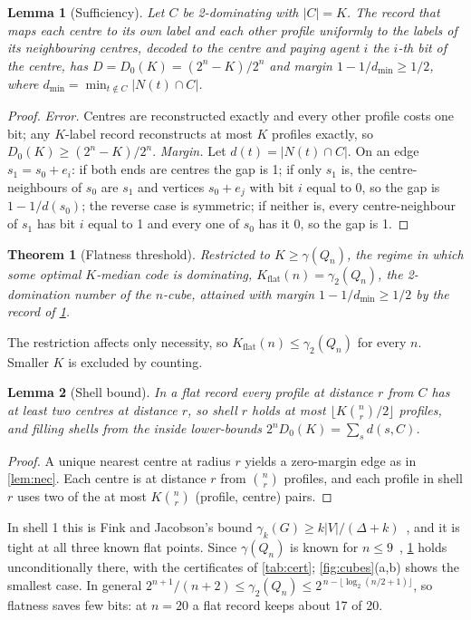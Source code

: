\documentclass[sigconf,anonymous,acmthm=false]{acmart}
\theoremstyle{acmplain}
\newtheorem{theorem}{Theorem}
\newtheorem{lemma}{Lemma}
\theoremstyle{acmdefinition}
\newcommand{\Kflat}{K_{\mathrm{flat}}}
\newcommand{\dmin}{d_{\min}}
\begin{document}
\begin{lemma}[Sufficiency]\label{lem:suff}
Let $C$ be 2-dominating with $|C|=K$. The record that maps each centre to its own label and
each other profile uniformly to the labels of its neighbouring centres, decoded to the centre
and paying agent $i$ the $i$-th bit of the centre, has $D=D_0(K)=(2^n-K)/2^n$ and margin
$1-1/\dmin\ge1/2$, where $\dmin=\min_{t\notin C}|N(t)\cap C|$.
\end{lemma}
\begin{proof}
\emph{Error.} Centres are reconstructed exactly and every other profile costs one bit; any
$K$-label record reconstructs at most $K$ profiles exactly, so $D_0(K)\ge(2^n-K)/2^n$.
\emph{Margin.} Let $d(t)=|N(t)\cap C|$. On an edge $s_1=s_0+e_i$: if both ends are centres the
gap is 1; if only $s_1$ is, the centre-neighbours of $s_0$ are $s_1$ and vertices $s_0+e_j$
with bit $i$ equal to 0, so the gap is $1-1/d(s_0)$; the reverse case is symmetric; if
neither is, every centre-neighbour of $s_1$ has bit $i$ equal to 1 and every one of $s_0$ has
it 0, so the gap is 1.
\end{proof}

\begin{theorem}[Flatness threshold]\label{thm:flat}
Restricted to $K\ge\gamma(Q_n)$, the regime in which some optimal $K$-median code is
dominating, $\Kflat(n)=\gamma_2(Q_n)$, the 2-domination number of the $n$-cube, attained with
margin $1-1/\dmin\ge1/2$ by the record of \cref{lem:suff}.
\end{theorem}

The restriction affects only necessity, so $\Kflat(n)\le\gamma_2(Q_n)$ for every $n$. Smaller
$K$ is excluded by counting.

\begin{lemma}[Shell bound]\label{lem:shell}
In a flat record every profile at distance $r$ from $C$ has at least two centres at distance
$r$, so shell $r$ holds at most $\lfloor K\binom nr/2\rfloor$ profiles, and filling shells from
the inside lower-bounds $2^nD_0(K)=\sum_sd(s,C)$.
\end{lemma}
\begin{proof}
A unique nearest centre at radius $r$ yields a zero-margin edge as in \cref{lem:nec}. Each
centre is at distance $r$ from $\binom nr$ profiles, and each profile in shell $r$ uses two
of the at most $K\binom nr$ (profile, centre) pairs.
\end{proof}

In shell 1 this is Fink and Jacobson's bound $\gamma_k(G)\ge k|V|/(\Delta+k)$~\cite{fink1985ndomination},
and it is tight at all three known flat points. Since $\gamma(Q_n)$ is known for
$n\le9$~\cite{ostergard2001length9}, \cref{thm:flat} holds unconditionally there, with the
certificates of \cref{tab:cert}; \cref{fig:cubes}(a,b) shows the smallest case. In general
$2^{n+1}/(n+2)\le\gamma_2(Q_n)\le2^{\,n-\lfloor\log_2(n/2+1)\rfloor}$, so flatness saves few
bits: at $n=20$ a flat record keeps about 17 of 20.
\end{document}
